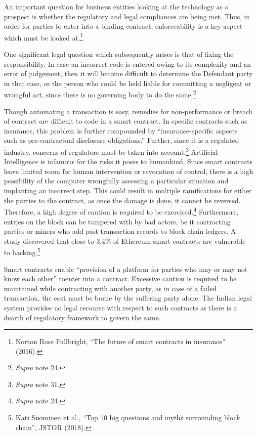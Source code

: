 \begin{multicols}{2}
\noi
An important question for business entities looking at the technology as a prospect is whether
the regulatory and legal compliances are being met. Thus, in order for parties to enter into a
binding contract, enforceability is a key aspect which must be looked at.\footnote{Norton Rose Fullbright, “The future of smart contracts in insurance” (2016).}

\noi
One significant legal question which subsequently arises is that of fixing the responsibility. In
case an incorrect code is entered owing to its complexity and an error of judgement, then it
will become difficult to determine the Defendant party in that case, or the person who could
be held liable for committing a negligent or wrongful act, since there is no governing body to
do the same.\footnote{\textit{Supra} note 24.}

\noi
Though automating a transaction is easy, remedies for non-performance or breach of contract
are difficult to code in a smart contract. In specific contracts such as insurance, this problem
is further compounded by “insurance-specific aspects such as pre-contractual disclosure
obligations.” Further, since it is a regulated industry, concerns of regulators must be taken
into account.\footnote{\textit{Supra} note 31.} Artificial Intelligence is infamous for the risks it poses to humankind. Since
smart contracts leave limited room for human intervention or revocation of control, there is a
high possibility of the computer wrongfully assessing a particular situation and implanting an
incorrect step. This could result in multiple ramifications for either the parties to the contract,
as once the damage is done, it cannot be reversed. Therefore, a high degree of caution is
required to be exercised.\footnote{\textit{Supra} note 24.} Furthermore, entries on the block can be tampered with by bad
actors, be it contracting parties or miners who add past transaction records to block chain
ledgers. A study discovered that close to 3.4\% of Ethereum smart contracts are vulnerable to
hacking.\footnote{Kati Suominen et al., “Top 10 big questions and myths surrounding block chain”, JSTOR (2018).}

\noi
Smart contracts enable “provision of a platform for parties who may or may not know each
other” to\break enter into a contract. Excessive caution is required to be maintained while
contracting with another party, as in case of a failed transaction, the cost must be borne by the suffering party alone. The Indian legal system provides no legal recourse with respect to such
contracts as there is a dearth of regulatory framework to govern the same. 


\end{multicols}
